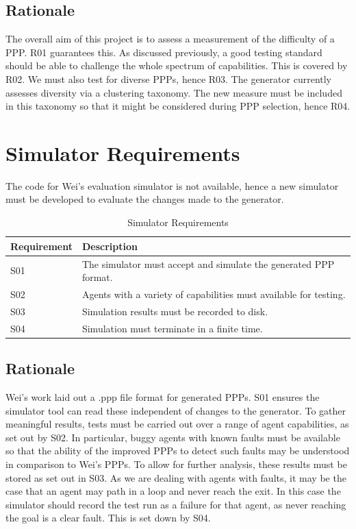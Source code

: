 \documentclass[authoryearcitations]{UoYCSproject}
\begin{document}
\subsection{Rationale}
\label{sec:pa4_rat}
The overall aim of this project is to assess a measurement of the difficulty of a PPP. R01 guarantees this. As discussed previously, a good testing standard should be able to challenge the whole spectrum of capabilities. This is covered by R02. We must also test for diverse PPPs, hence R03. The generator currently assesses diversity via a clustering taxonomy. The new measure must be included in this taxonomy so that it might be considered during PPP selection, hence R04.

\section{Simulator Requirements}
\label{sec:pa5}
The code for Wei's evaluation simulator is not available, hence a new simulator must be developed to evaluate the changes made to the generator.\\

\begin{table}
\begin{tabular}{|l | p{9cm}|}
\hline
Requirement & Description \\
\hline
S01 & The simulator must accept and simulate the generated PPP format.\\
S02 & Agents with a variety of capabilities must available for testing.\\
S03 & Simulation results must be recorded to disk.\\
S04 & Simulation must terminate in a finite time.\\
\hline
\end{tabular}
\caption{Simulator Requirements}
\label{table:simreq}
\end{table}

\subsection{Rationale}
\label{sec:pa5_rat}
Wei's work laid out a .ppp file format for generated PPPs. S01 ensures the simulator tool can read these independent of changes to the generator. To gather meaningful results, tests must be carried out over a range of agent capabilities, as set out by S02. In particular, buggy agents with known faults must be available so that the ability of the improved PPPs to detect such faults may be understood in comparison to Wei's PPPs. To allow for further analysis, these results must be stored as set out in S03. As we are dealing with agents with faults, it may be the case that an agent may path in a loop and never reach the exit. In this case the simulator should record the test run as a failure for that agent, as never reaching the goal is a clear fault. This is set down by S04.
\end{document}
